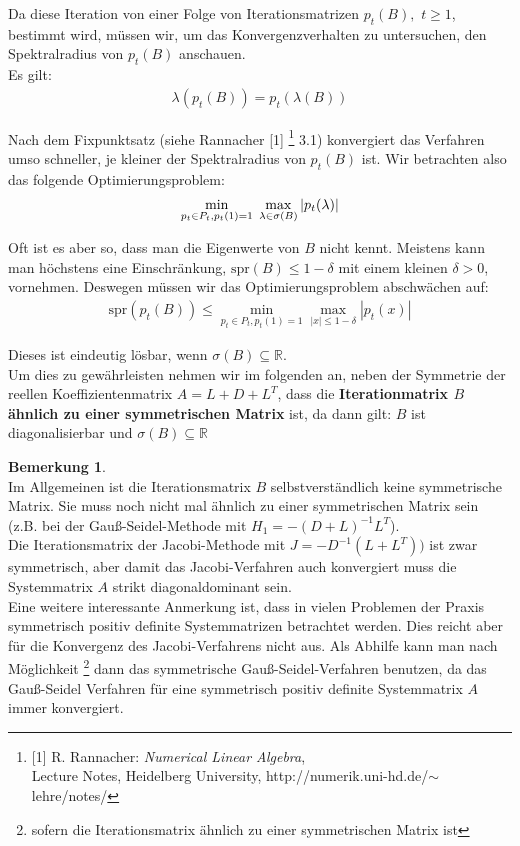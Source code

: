 \documentclass[12pt,a4paper,numbers=endperiod]{scrartcl}
\theoremstyle{definition}
\newtheorem{bem}[satz]{Bemerkung}
\newcommand{\spr}{\text{spr}}
\def\RR{{\mathbb R}}
\begin{document}
Da diese Iteration von einer Folge von Iterationsmatrizen $p_t(B),$ $t \geq 1$, bestimmt wird, müssen wir, um das Konvergenzverhalten zu untersuchen, den Spektralradius von $p_t(B)$ anschauen.\\ 

Es gilt: 
\begin{gather}
	\lambda(p_t(B)) = p_t(\lambda(B))
\end{gather}

Nach dem Fixpunktsatz (siehe Rannacher [1] \footnote{[1] R. Rannacher: \textit{Numerical Linear Algebra},\\ Lecture Notes, Heidelberg University, http://numerik.uni-hd.de/$\sim$lehre/notes/ } 3.1) konvergiert das Verfahren umso schneller, je kleiner der Spektralradius von $p_t(B)$ ist. Wir betrachten also das folgende Optimierungsproblem: 
\begin{gather}
	\min\limits_{p_t \in P_t, p_t(1) = 1} \hspace{1mm} \max\limits_{\lambda \in \sigma(B)} |p_t(\lambda)|
\end{gather}

Oft ist es aber so, dass man die Eigenwerte von $B$ nicht kennt. Meistens kann man höchstens eine Einschränkung, $\spr(B) \leq 1 - \delta$ mit einem kleinen $\delta >0$, vornehmen. Deswegen müssen wir das Optimierungsproblem abschwächen auf: 
\begin{gather}
	\spr(p_t(B)) \leq \min_{p_t \in P_t, p_t(1) = 1} \max\limits_{|x| \leq 1- \delta} |p_t(x)| 
\end{gather}

Dieses ist eindeutig lösbar, wenn $\sigma(B) \subseteq \RR$.\\

Um dies zu gewährleisten nehmen wir im folgenden an, neben der Symmetrie der reellen Koeffizientenmatrix $A = L + D + L^T$, dass die \textbf{Iterationmatrix $B$  ähnlich zu einer symmetrischen Matrix} ist, da dann gilt: $B$ ist diagonalisierbar und $\sigma(B) \subseteq \RR$
\begin{bem}
	$ $\\
	Im Allgemeinen ist die Iterationsmatrix $B$ selbstverständlich keine symmetrische Matrix. Sie muss noch nicht mal ähnlich zu einer symmetrischen Matrix sein (z.B. bei der Gauß-Seidel-Methode mit $H_1 = -(D+L)^{-1}L^T$).\\
	Die Iterationsmatrix der Jacobi-Methode mit $J = -D^{-1}(L+L^T))$ ist zwar symmetrisch, aber damit das Jacobi-Verfahren auch konvergiert muss die Systemmatrix $A$ strikt diagonaldominant sein.\\
	Eine weitere interessante Anmerkung ist, dass in vielen Problemen der Praxis symmetrisch positiv definite Systemmatrizen betrachtet werden. Dies reicht aber für die Konvergenz des Jacobi-Verfahrens nicht aus. Als Abhilfe kann man nach Möglichkeit \footnote{sofern die Iterationsmatrix ähnlich zu einer symmetrischen Matrix ist} dann das symmetrische Gauß-Seidel-Verfahren benutzen, da das Gauß-Seidel Verfahren für eine symmetrisch positiv definite Systemmatrix $A$ immer konvergiert. 
\end{bem}
\end{document}
